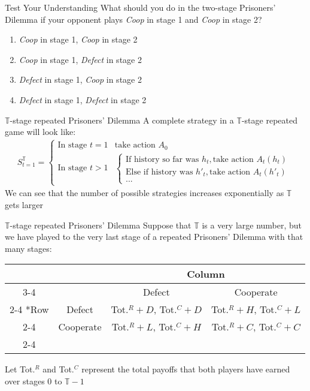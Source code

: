 \begin{frame}{Test Your Understanding}
  What should you do in the two-stage Prisoners' Dilemma 
  if your opponent plays \textit{Coop} in stage 1 and \textit{Coop} in stage 2?
  \begin{enumerate}[label=\textbf{\alph*)}]
    \item \textit{Coop} in stage 1, \textit{Coop} in stage 2
    \item \textit{Coop} in stage 1, \textit{Defect} in stage 2
    \item \textit{Defect} in stage 1, \textit{Coop} in stage 2
    \item \textit{Defect} in stage 1, \textit{Defect} in stage 2
  \end{enumerate}
\end{frame}

\begin{frame}{$\mathbb{T}$-stage repeated Prisoners' Dilemma}
  A complete strategy in a $\mathbb{T}$-stage repeated game will look like:
  \begin{align*}
    S_{t=1}^{\mathbb{T}} = 
    \begin{cases}
    \text{In stage } t=1 & \text{take action } A_0 \\ 
    \text{In stage } t>1 & 
    \begin{cases}
      \text{If history so far was } h_t, \text{take action } A_t(h_t) \\
      \text{Else if history was } h'_t, \text{take action } A_t(h'_t) \\ 
      ... 
    \end{cases}
    \end{cases}
  \end{align*}
  We can see that the number of possible strategies increases exponentially as $\mathbb{T}$ gets larger
\end{frame}

\begin{frame}{$\mathbb{T}$-stage repeated Prisoners' Dilemma}
  Suppose that $\mathbb{T}$ is a very large number, but we have played to the very last stage of a repeated Prisoners' Dilemma with that many stages:
  \begin{center}
    \begin{tabular}{*{4}{c|}}
      \multicolumn{2}{c}{} & \multicolumn{2}{c}{Column} \\ \cline{3-4}
      \multicolumn{1}{c}{} &        & Defect & Cooperate \\ \cline{2-4}
      \multirow{2}*{Row} & Defect   & Tot.$^R + D$, Tot.$^C + D$ & Tot.$^R + H$, Tot.$^C + L$ \\ \cline{2-4}
                         & Cooperate& Tot.$^R + L$, Tot.$^C + H$ & Tot.$^R + C$, Tot.$^C + C$ \\ \cline{2-4}
    \end{tabular} 
  \end{center}
  Let Tot.$^R$ and Tot.$^C$ represent the total payoffs that both players have earned over 
  stages 0 to $\mathbb{T} -1$
\end{frame}

